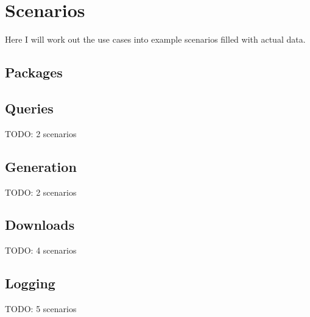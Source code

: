 \newpage
\section{Scenarios}  
Here I will work out the use cases into example scenarios filled with actual
data.


\subsection{Packages}









\subsection{Queries}
TODO: 2 scenarios











%


\subsection{Generation}
TODO: 2 scenarios
%
%


\subsection{Downloads}
TODO: 4 scenarios
%
%
%
%


\subsection{Logging}
TODO: 5 scenarios
%
%
%
%
%


